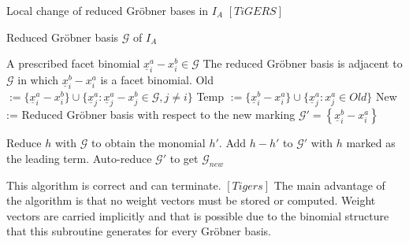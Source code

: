 
\begin{algorithm}
\caption{Local change of reduced Gröbner bases in $I_A$ $\left[ TiGERS\right]  $}
\label{alg:flip}
\begin{algorithmic}[1]

\Require
Reduced Gröbner basis $ \mathcal{G} $ of $I_A$

    A prescribed facet binomial $ \underline{x}^{a}_{i} - x^{b}_{i} \in \mathcal{G} $
\Ensure The reduced Gröbner basis is adjacent to $\mathcal{G}$ in which $ \underline{x}^{b}_{i} - x^{a}_{i} $ is a facet binomial.
\State Old 
$:= \lbrace \underline{x}^{a}_{i} - x^{b}_{i} \rbrace \cup
 \lbrace \underline{x}^{a}_{j} : \underline{x}^{a}_{j} - x^{b}_{j} \in \mathcal{G},
 j \neq i \rbrace $ 
 \State Temp $:= \lbrace \underline{x}^{b}_{i} - x^{a}_{i} \rbrace \cup 
 \lbrace \underline{x}^{a}_{j} : x^{a}_{j} \in Old  \rbrace $
 \State New := Reduced Gröbner basis with respect to the new marking 
 \State $\mathcal{G}' = \left\lbrace \underline{x}^{b}_{i} - x^{a}_{i} \right\rbrace  $
 
 \State Reduce $h$ with $\mathcal{G}$ to obtain the monomial $h'$.
 \State Add $h-h'$ to $\mathcal{G}'$ with $h$ marked as the leading term.
 \EndFor
 \State Auto-reduce $\mathcal{G}'$ to get $\mathcal{G}_{new}$

\end{algorithmic}
\end{algorithm}

This algorithm is correct and can terminate. $ \left[ Tigers \right] $
The main advantage of the algorithm is that no weight vectors must be stored or computed.
Weight vectors are carried implicitly and that is possible due to the binomial structure that this subroutine generates for every Gröbner basis.

